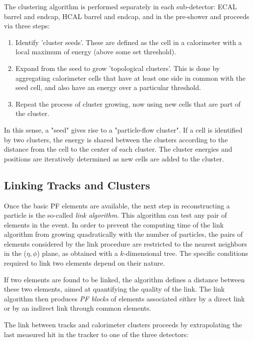 The clustering algorithm is performed separately in each sub-detector: ECAL barrel and endcap, HCAL barrel and endcap, and in the pre-shower and proceeds via three steps\cite{CMS:2009nxa}:

\begin{enumerate}
	\item Identify 'cluster seeds'. These are defined as the cell in a calorimeter with a local maximum of energy (above some set threshold).
	\item Expand from the seed to grow 'topological clusters'. This is done by aggregating calorimeter cells that have at least one side in common with the seed cell, and also have an energy over a particular threshold.
	\item Repeat the process of cluster growing, now using new cells that are part of the cluster.
\end{enumerate}

In this sense, a "seed" gives rise to a "particle-flow cluster". If a cell is identified by two clusters, the energy is shared between the clusters according to the distance from the cell to the center of each cluster. The cluster energies and positions are iteratively determined as new cells are added to the cluster.

\subsection{Linking Tracks and Clusters}
Once the basic PF elements are available, the next step in reconstructing a particle is the so-called \textit{link algorithm}. This algorithm can test any pair of elements in the event. In order to prevent the computing time of the link algorithm from growing quadratically with the number of particles, the pairs of elements considered by the link procedure are restricted to the nearest neighbors in the ($\eta,\phi$) plane, as obtained with a $k$-dimensional tree\cite{Bentley1975MultidimensionalBS}. The specific conditions required to link two elements depend on their nature.

 If two elements are found to be linked, the algorithm defines a distance between these two elements, aimed at quantifying the quality of the link. The link algorithm then produces \textit{PF blocks} of elements associated either by a direct link or by an indirect link through common elements.

 The link between tracks and calorimeter clusters proceeds by extrapolating the last measured hit in the tracker to one of the three detectors\cite{CMS:2009nxa}:

